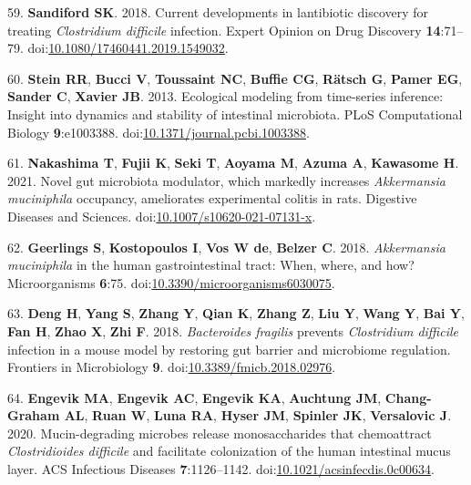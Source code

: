 \documentclass[
  12pt,
]{article}
\newenvironment{cslreferences}%
  {}%
  {\par}
\begin{document}
\begin{cslreferences}
\leavevmode\hypertarget{ref-Sandiford2018}{}%
59. \textbf{Sandiford SK}. 2018. Current developments in lantibiotic
discovery for treating \emph{Clostridium difficile} infection. Expert
Opinion on Drug Discovery \textbf{14}:71--79.
doi:\href{https://doi.org/10.1080/17460441.2019.1549032}{10.1080/17460441.2019.1549032}.

\leavevmode\hypertarget{ref-Stein2013}{}%
60. \textbf{Stein RR}, \textbf{Bucci V}, \textbf{Toussaint NC},
\textbf{Buffie CG}, \textbf{Rätsch G}, \textbf{Pamer EG}, \textbf{Sander
C}, \textbf{Xavier JB}. 2013. Ecological modeling from time-series
inference: Insight into dynamics and stability of intestinal microbiota.
PLoS Computational Biology \textbf{9}:e1003388.
doi:\href{https://doi.org/10.1371/journal.pcbi.1003388}{10.1371/journal.pcbi.1003388}.

\leavevmode\hypertarget{ref-Nakashima2021}{}%
61. \textbf{Nakashima T}, \textbf{Fujii K}, \textbf{Seki T},
\textbf{Aoyama M}, \textbf{Azuma A}, \textbf{Kawasome H}. 2021. Novel
gut microbiota modulator, which markedly increases \emph{Akkermansia
muciniphila} occupancy, ameliorates experimental colitis in rats.
Digestive Diseases and Sciences.
doi:\href{https://doi.org/10.1007/s10620-021-07131-x}{10.1007/s10620-021-07131-x}.

\leavevmode\hypertarget{ref-Geerlings2018}{}%
62. \textbf{Geerlings S}, \textbf{Kostopoulos I}, \textbf{Vos W de},
\textbf{Belzer C}. 2018. \emph{Akkermansia muciniphila} in the human
gastrointestinal tract: When, where, and how? Microorganisms
\textbf{6}:75.
doi:\href{https://doi.org/10.3390/microorganisms6030075}{10.3390/microorganisms6030075}.

\leavevmode\hypertarget{ref-Deng2018}{}%
63. \textbf{Deng H}, \textbf{Yang S}, \textbf{Zhang Y}, \textbf{Qian K},
\textbf{Zhang Z}, \textbf{Liu Y}, \textbf{Wang Y}, \textbf{Bai Y},
\textbf{Fan H}, \textbf{Zhao X}, \textbf{Zhi F}. 2018. \emph{Bacteroides
fragilis} prevents \emph{Clostridium difficile} infection in a mouse
model by restoring gut barrier and microbiome regulation. Frontiers in
Microbiology \textbf{9}.
doi:\href{https://doi.org/10.3389/fmicb.2018.02976}{10.3389/fmicb.2018.02976}.

\leavevmode\hypertarget{ref-Engevik2020}{}%
64. \textbf{Engevik MA}, \textbf{Engevik AC}, \textbf{Engevik KA},
\textbf{Auchtung JM}, \textbf{Chang-Graham AL}, \textbf{Ruan W},
\textbf{Luna RA}, \textbf{Hyser JM}, \textbf{Spinler JK},
\textbf{Versalovic J}. 2020. Mucin-degrading microbes release
monosaccharides that chemoattract \emph{Clostridioides difficile} and
facilitate colonization of the human intestinal mucus layer. ACS
Infectious Diseases \textbf{7}:1126--1142.
doi:\href{https://doi.org/10.1021/acsinfecdis.0c00634}{10.1021/acsinfecdis.0c00634}.


\end{cslreferences}
\end{document}
